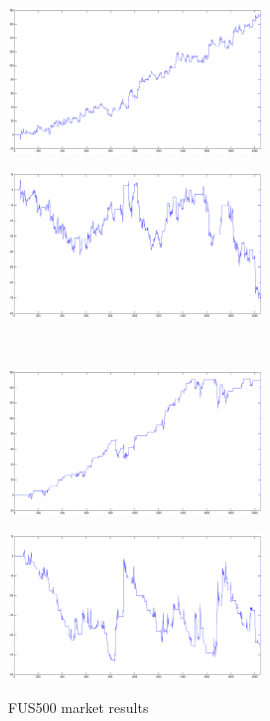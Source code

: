 \documentclass{tewiart}
\begin{document}
\begin{figure}[h]
\centering
\begin{minipage}{\linewidth}
\centering
\includegraphics[width=0.6\textwidth]{images/fus500A.eps}
\label{jedno}
\end{minipage}
\begin{minipage}{\linewidth}
\centering
\includegraphics[width=0.6\textwidth]{images/fus500B.eps}
\label{dwu}
\end{minipage}
\\
\begin{minipage}{\linewidth}
\centering
\includegraphics[width=0.6\textwidth]{images/fus500C.eps}
\label{cztero}
\end{minipage}
\begin{minipage}{\linewidth}
\centering
\includegraphics[width=0.6\textwidth]{images/fus500D.eps}
\label{mansard}
\end{minipage}
\caption{FUS500 market results}
\end{figure}
\end{document}
